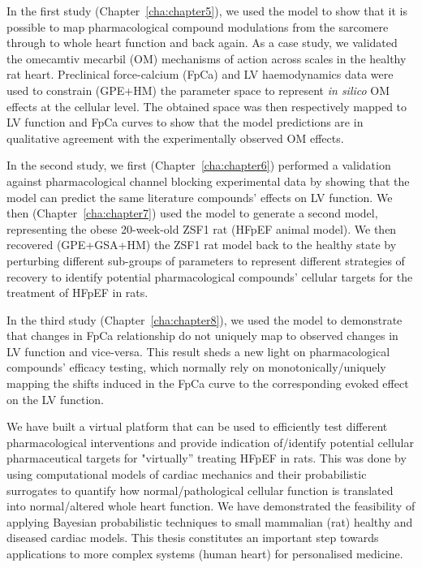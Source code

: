 \newpage
In the first study (Chapter~\ref{cha:chapter5}), we used the model to show that it is possible to map pharmacological compound modulations from the sarcomere through to whole heart function and back again. As a case study, we validated the omecamtiv mecarbil (OM) mechanisms of action across scales in the healthy rat heart. Preclinical force-calcium (FpCa) and LV haemodynamics data were used to constrain (GPE+HM) the parameter space to represent \textit{in silico} OM effects at the cellular level. The obtained space was then respectively mapped to LV function and FpCa curves to show that the model predictions are in qualitative agreement with the experimentally observed OM effects.

\vspace{0.2cm}
In the second study, we first (Chapter~\ref{cha:chapter6}) performed a validation against pharmacological channel blocking experimental data by showing that the model can predict the same literature compounds' effects on LV function. We then (Chapter~\ref{cha:chapter7}) used the model to generate a second model, representing the obese 20-week-old ZSF1 rat (HFpEF animal model). We then recovered (GPE+GSA+HM) the ZSF1 rat model back to the healthy state by perturbing different sub-groups of parameters to represent different strategies of recovery to identify potential pharmacological compounds' cellular targets for the treatment of HFpEF in rats.

\vspace{0.2cm}
In the third study (Chapter~\ref{cha:chapter8}), we used the model to demonstrate that changes in FpCa relationship do not uniquely map to observed changes in LV function and vice-versa. This result sheds a new light on pharmacological compounds' efficacy testing, which normally rely on monotonically/uniquely mapping the shifts induced in the FpCa curve to the corresponding evoked effect on the LV function.

\vspace{0.2cm}
We have built a virtual platform that can be used to efficiently test different pharmacological interventions and provide indication of/identify potential cellular pharmaceutical targets for "virtually'' treating HFpEF in rats. This was done by using computational models of cardiac mechanics and their probabilistic surrogates to quantify how normal/pathological cellular function is translated into normal/altered whole heart function. We have demonstrated the feasibility of applying Bayesian probabilistic techniques to small mammalian (rat) healthy and diseased cardiac models. This thesis constitutes an important step towards applications to more complex systems (human heart) for personalised medicine.

\endgroup

\vfill
